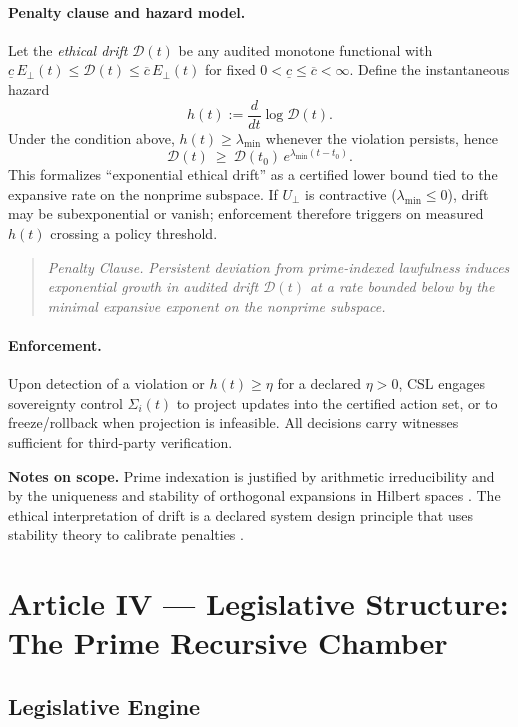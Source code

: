 \documentclass[12pt]{amsart}
\theoremstyle{plain}
\begin{document}
\paragraph{Penalty clause and hazard model.}
Let the \emph{ethical drift} $\mathcal{D}(t)$ be any audited monotone functional with $\underline{c}\,E_\perp(t)\le \mathcal{D}(t)\le \overline{c}\,E_\perp(t)$ for fixed $0<\underline{c}\le\overline{c}<\infty$. Define the instantaneous hazard
\[
h(t):=\frac{d}{dt}\log \mathcal{D}(t).
\]
Under the condition above, $h(t)\ge \lambda_{\min}$ whenever the violation persists, hence
\[
\mathcal{D}(t)\ \ge\ \mathcal{D}(t_0)\,e^{\lambda_{\min}(t-t_0)}.
\]
This formalizes “exponential ethical drift” as a certified lower bound tied to the expansive rate on the nonprime subspace. If $U_{\perp}$ is contractive ($\lambda_{\min}\le 0$), drift may be subexponential or vanish; enforcement therefore triggers on measured $h(t)$ crossing a policy threshold.

\begin{quote}
\textit{Penalty Clause.} \emph{Persistent deviation from prime-indexed lawfulness induces exponential growth in audited drift $\mathcal{D}(t)$ at a rate bounded below by the minimal expansive exponent on the nonprime subspace.}
\end{quote}

\paragraph{Enforcement.}
Upon detection of a violation or $h(t)\ge \eta$ for a declared $\eta>0$, CSL engages sovereignty control $\Sigma_i(t)$ to project updates into the certified action set, or to freeze/rollback when projection is infeasible. All decisions carry witnesses sufficient for third-party verification.

\medskip
\noindent\textbf{Notes on scope.} Prime indexation is justified by arithmetic irreducibility \cite{hardy2008introduction} and by the uniqueness and stability of orthogonal expansions in Hilbert spaces \cite{rudin1991functional,conway1990functional,lax2002functional}. The ethical interpretation of drift is a declared system design principle that uses stability theory to calibrate penalties \cite{khalil2002nonlinear}.
\section{Article IV — Legislative Structure: The Prime Recursive Chamber}

\subsection{Legislative Engine}
\end{document}
